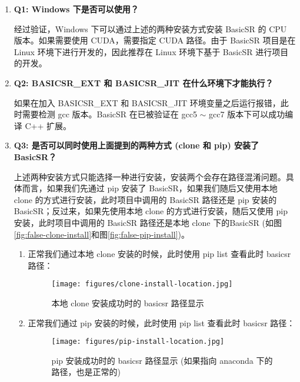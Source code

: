 \documentclass[../main.tex]{subfiles}
\begin{document}
\begin{enumerate}
    \item \textbf{Q1: Windows 下是否可以使用？}

    经过验证，Windows 下可以通过上述的两种安装方式安装 BasicSR 的 CPU 版本。如果需要使用 CUDA，需要指定 CUDA 路径。由于 BasicSR 项目是在 Linux 环境下进行开发的，因此推荐在 Linux 环境下基于 BasicSR 进行项目的开发。

    \item \textbf{Q2: BASICSR\_EXT 和 BASICSR\_JIT 在什么环境下才能执行？}

    如果在加入 BASICSR\_EXT 和 BASICSR\_JIT 环境变量之后运行报错，此时需要检测 gcc 版本。BasicSR 在已被验证在 gcc5 $\sim$ gcc7 版本下可以成功编译 C++ 扩展。

    \item \textbf{Q3: 是否可以同时使用上面提到的两种方式 (clone 和 pip) 安装了 BasicSR？}

    上述两种安装方式只能选择一种进行安装，安装两个会存在路径混淆问题。具体而言，如果我们先通过 pip 安装了 BasicSR，如果我们随后又使用本地 clone 的方式进行安装，此时项目中调用的 BasicSR 路径还是 pip 安装的 BasicSR；反过来，如果先使用本地 clone 的方式进行安装，随后又使用 pip 安装，此时项目中调用的 BasicSR 路径还是本地 clone 下的BasicSR (如图\ref{fig:false-clone-install}和图\ref{fig:false-pip-install})。

\begin{enumerate}
    \item 正常我们通过本地 clone 安装的时候，此时使用 pip list 查看此时 basicsr 路径：
    \begin{figure}[H]
	\begin{center}
		\texttt{[image: figures/clone-install-location.jpg]}
		\caption{本地 clone 安装成功时的 basicsr 路径显示}
		\label{fig:correct-clone-install}
	\end{center}
	\vspace{-0.5cm}
    \end{figure}

    \item 正常我们通过 pip 安装的时候，此时使用 pip list 查看此时 basicsr 路径：
    \begin{figure}[H]
	\begin{center}
		\texttt{[image: figures/pip-install-location.jpg]}
		\caption{pip 安装成功时的 basicsr 路径显示 (如果指向 anaconda 下的路径，也是正常的)}
		\label{fig:correct-pip-install}
	\end{center}
	\vspace{-0.5cm}
    \end{figure}


\end{enumerate}
\end{enumerate}
\end{document}

